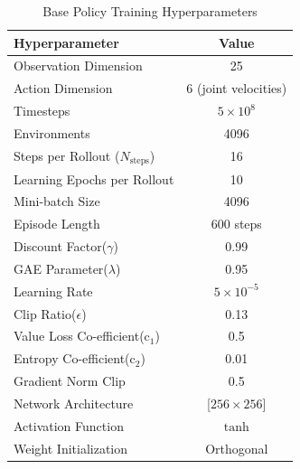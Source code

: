 \documentclass[a4paper,fleqn]{cas-dc}
\begin{document}
\begin{table}[h]
\caption{Base Policy Training Hyperparameters}
\centering
\begin{tabular}{lc}
\midrule 
\textbf{Hyperparameter} & \textbf{Value} \\
\midrule \midrule
Observation Dimension & 25 \\
Action Dimension & 6 (joint velocities) \\
Timesteps  & $5 \times 10^{8}$\\
Environments & 4096 \\
Steps per Rollout ($N_{\text{steps}}$) & 16 \\
Learning Epochs per Rollout & 10 \\
Mini-batch Size & 4096 \\
Episode Length & 600 steps \\
Discount Factor($\gamma$) & 0.99 \\
GAE Parameter($\lambda$) & 0.95 \\
Learning Rate & $5 \times 10^{-5}$ \\
Clip Ratio($\epsilon$) & 0.13\\
Value Loss Co-efficient($\text{c}_1$) & 0.5\\
Entropy Co-efficient($\text{c}_2$) & 0.01\\
Gradient Norm Clip & 0.5\\
Network Architecture & [$256 \times 256$]\\
Activation Function & $\tanh$\\
Weight Initialization & Orthogonal\\
\bottomrule
\end{tabular}
\label{tab:base_policy_hyperparameters}
\end{table}
\end{document}

